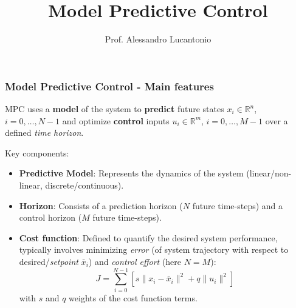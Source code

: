\documentclass{beamer}
\title{Model Predictive Control}
\author{Prof. Alessandro Lucantonio}
\institute{Aarhus University}
\date{}
\begin{document}
	\frame{\titlepage}
	
	
			
			\begin{frame}
				\frametitle{Model Predictive Control - Main features}
				MPC uses a \textbf{model} of the system to \textbf{predict} future states $x_i \in \mathbb{R}^n$, $i=0,\dots,N-1$ and optimize \textbf{control} inputs $u_i \in \mathbb{R}^m$, $i=0,\dots,M-1$ over a defined \textit{time horizon}.
				
				\vspace{5mm}
				
				Key components:
				\begin{itemize}
				\item \textbf{Predictive Model}: Represents the dynamics of the system (linear/non-linear, discrete/continuous).
				\item \textbf{Horizon}: Consists of a prediction horizon ($N$ future time-steps) and a control horizon ($M$ future time-steps).
				\item \textbf{Cost function}: Defined to quantify the desired system performance, typically involves minimizing \textit{error} (of system trajectory with respect to desired/\textit{setpoint} $\bar{x}_i$) and \textit{control effort} (here $N=M$):
				$$ J = \sum_{i=0}^{N-1}[{s\|x_i - \bar{x}_i\|^2} + q\|u_i\|^2]$$
				with $s$ and $q$ weights of the cost function terms.
				\end{itemize}
		
				
			\end{frame}
			
\end{document}
